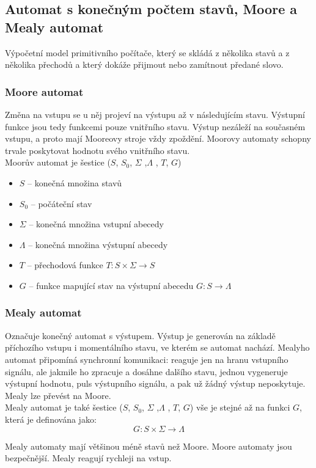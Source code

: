 
\subsection{Automat s konečným počtem stavů, Moore a Mealy automat}
Výpočetní model primitivního počítače, který se skládá z několika stavů a z několika přechodů a který dokáže přijmout nebo zamítnout předané slovo.
\subsubsection{Moore automat}
Změna na vstupu se u něj projeví na výstupu až v následujícím stavu. Výstupní funkce jsou tedy funkcemi pouze vnitřního stavu. Výstup nezáleží na současném vstupu, 
a proto mají Mooreovy stroje vždy zpoždění. Moorovy automaty schopny trvale poskytovat hodnotu svého vnitřního stavu. \\
Moorův automat je šestice ($S$, $S_0$, $\Sigma$ ,$\Lambda$ , $T$, $G$)
\begin{itemize}
\item $S$ -- konečná množina stavů
\item $S_0$ -- počáteční stav
\item $\Sigma$ -- konečná množina vstupní abecedy
\item $\Lambda$ -- konečná množina výstupní abecedy
\item $T$ -- přechodová funkce $T : S \times \Sigma \rightarrow S$
\item $G$ -- funkce mapující stav na výstupní abecedu $G : S \rightarrow \Lambda$
\end{itemize}

\subsubsection{Mealy automat}
Označuje konečný automat s výstupem. Výstup je generován na základě příchozího vstupu i momentálního stavu, ve kterém se automat nachází.
Mealyho automat připomíná synchronní komunikaci: reaguje jen na hranu vstupního signálu, ale jakmile ho zpracuje a dosáhne dalšího stavu, jednou vygeneruje výstupní hodnotu, 
puls výstupního signálu, a pak už žádný výstup neposkytuje. Mealy lze převést na Moore. \\
Mealy automat je také šestice ($S$, $S_0$, $\Sigma$ ,$\Lambda$ , $T$, $G$) vše je stejné až na funkci $G$, která je definována jako:
\begin{equation*}
	G : S \times \Sigma \rightarrow \Lambda
\end{equation*}

Mealy automaty mají většinou méně stavů než Moore. Moore automaty jsou bezpečnější. Mealy reagují rychleji na vstup.